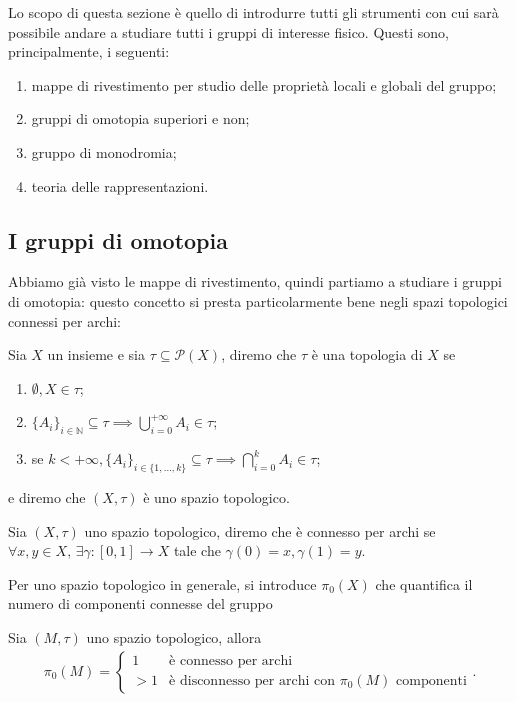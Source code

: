 Lo scopo di questa sezione è quello di introdurre tutti gli strumenti con cui sarà possibile andare a studiare tutti i gruppi di interesse fisico.
Questi sono, principalmente, i seguenti:

\begin{enumerate}[label=\protect\circled{\arabic*}]
    \item mappe di rivestimento per studio delle proprietà locali e globali del gruppo;
    \item gruppi di omotopia superiori e non;
    \item gruppo di monodromia;
    \item teoria delle rappresentazioni. 
\end{enumerate}

\subsection{I gruppi di omotopia}

Abbiamo già visto le mappe di rivestimento, quindi partiamo a studiare i gruppi di omotopia: questo concetto si presta particolarmente bene negli spazi topologici connessi per archi:

\begin{definition}
    Sia $X$ un insieme e sia $\tau \subseteq \mathcal{P}(X)$, diremo che $\tau$ è una topologia di $X$ se
    \begin{enumerate}[label=\protect\circled{\arabic*}]
        \item $\emptyset, X \in \tau$;
        \item $\{ A_i \}_{i \in \mathbb{N}} \subseteq \tau \implies \bigcup\limits_{i=0}^{+\infty} A_i \in \tau$;
        \item se $k < +\infty, \{ A_i \}_{i \in \{ 1, \ldots, k\}} \subseteq \tau \implies \bigcap\limits_{i=0}^k A_i \in \tau$;
    \end{enumerate}
    e diremo che $(X,\tau)$ è uno spazio topologico.
\end{definition}

\begin{definition}
    Sia $(X, \tau)$ uno spazio topologico, diremo che è connesso per archi se $\forall x, y \in X, \, \exists \gamma : [0,1] \to X$ tale che $\gamma(0) = x, \gamma(1) = y$.
\end{definition}

Per uno spazio topologico in generale, si introduce $\pi_0(X)$ che quantifica il numero di componenti connesse del gruppo
\begin{definition}
    Sia $(M, \tau)$ uno spazio topologico, allora
    \begin{align}
        \pi_0(M) = \begin{cases}
            1 & \text{è connesso per archi} \\
            > 1 & \text{è disconnesso per archi con } \pi_0(M) \text{ componenti}
        \end{cases}.
    \end{align}
\end{definition}

